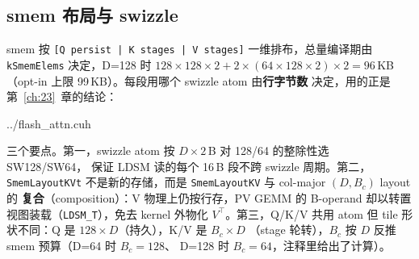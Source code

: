 \subsection{smem 布局与 swizzle}\label{sec:26b-smem}

smem 按 \texttt{[Q persist | K stages | V stages]} 一维排布，总量编译期由
\texttt{kSmemElems} 决定，D=128 时 $128{\times}128{\times}2 + 2{\times}(64{\times}128{\times}2)
\times 2 = 96$\,KB（opt-in 上限 99\,KB）。每段用哪个 swizzle atom 由\textbf{行字节数}
决定，用的正是第~\ref{ch:23}~章的结论：

\begin{lstinputlisting}[linerange={3527-3565},firstnumber=auto,
  title={flash\_attn.cuh L3527-3565（\texttt{Flash\allowbreak{}Attn\allowbreak{}Persist\allowbreak{}D\allowbreak{}Cu\allowbreak{}Te\allowbreak{}Traits}：smem 布局与双 TiledMma）}]{../flash_attn.cuh}
\end{lstinputlisting}

三个要点。第一，swizzle atom 按 $D\times 2$\,B 对 128/64 的整除性选 SW128/SW64，
保证 LDSM 读的每个 16\,B 段不跨 swizzle 周期。第二，\texttt{Smem\allowbreak{}Layout\allowbreak{}KVt}
不是新的存储，而是 \texttt{SmemLayoutKV} 与 col-major $(D, B_c)$ layout 的
\textbf{复合}（composition）：V 物理上仍按行存，PV GEMM 的 B-operand 却以转置
视图装载（\texttt{LDSM\_T}），免去 kernel 外物化 $V^\top$。第三，Q/K/V 共用
atom 但 tile 形状不同：Q 是 $128\times D$（持久），K/V 是 $B_c\times D$
（stage 轮转），$B_c$ 按 $D$ 反推 smem 预算（D=64 时 $B_c{=}128$、
D=128 时 $B_c{=}64$，注释里给出了计算）。

